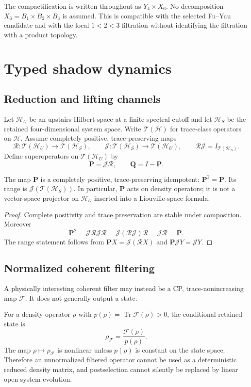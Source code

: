 \documentclass[11pt]{article}
\DeclareMathOperator{\Tr}{Tr}
\newcommand{\T}{\mathcal T}
\newcommand{\cH}{\mathcal H}
\newcommand{\cP}{\mathbf P}
\newcommand{\cQ}{\mathbf Q}
\newcommand{\R}{\mathcal R}
\newcommand{\J}{\mathcal J}
\begin{document}
The compactification is written throughout as $Y_4\times X_6$. No decomposition
$X_6=B_1\times B_2\times B_3$ is assumed. This is compatible with the selected
Fu--Yau candidate and with the local $1<2<3$ filtration without identifying the
filtration with a product topology.

\section{Typed shadow dynamics}

\subsection{Reduction and lifting channels}

Let $\cH_U$ be an upstairs Hilbert space at a finite spectral cutoff and let
$\cH_S$ be the retained four-dimensional system space. Write
$\T(\cH)$ for trace-class operators on $\cH$. Assume completely positive,
trace-preserving maps
\[
 \R:\T(\cH_U)\to\T(\cH_S),\qquad
 \J:\T(\cH_S)\to\T(\cH_U),
 \qquad \R\J=I_{\T(\cH_S)}.
\]
Define superoperators on $\T(\cH_U)$ by
\[
 \cP=\J\R,\qquad \cQ=I-\cP.
\]

\begin{theorem}\label{thm:typed}
The map $\cP$ is a completely positive, trace-preserving idempotent:
$\cP^2=\cP$. Its range is $\J(\T(\cH_S))$. In particular, $\cP$ acts on
density operators; it is not a vector-space projector on $\cH_U$ inserted into a
Liouville-space formula.
\end{theorem}

\begin{proof}
Complete positivity and trace preservation are stable under composition. Moreover
\[
 \cP^2=\J\R\J\R=\J(\R\J)\R=\J\R=\cP.
\]
The range statement follows from $\cP X=\J(\R X)$ and $\cP\J Y=\J Y$.
\end{proof}

\subsection{Normalized coherent filtering}

A physically interesting coherent filter may instead be a CP,
trace-nonincreasing map $\mathcal F$. It does not generally output a state.

\begin{proposition}\label{prop:normalization}
For a density operator $\rho$ with
$p(\rho)=\Tr\mathcal F(\rho)>0$, the conditional retained state is
\[
 \rho_{\mathcal F}=\frac{\mathcal F(\rho)}{p(\rho)}.
\]
The map $\rho\mapsto\rho_{\mathcal F}$ is nonlinear unless $p(\rho)$ is constant
on the state space. Therefore an unnormalized filtered operator cannot be used as a
deterministic reduced density matrix, and postselection cannot silently be replaced
by linear open-system evolution.
\end{proposition}
\end{document}
